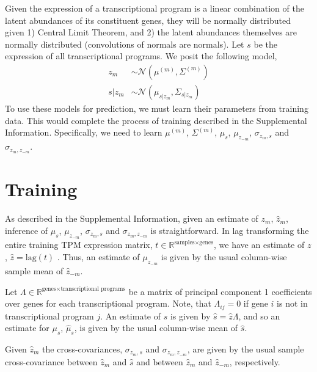 \documentclass[10pt]{article}
\begin{document}
Given the expression of a transcriptional program is a linear combination of the latent abundances of its constituent genes, they will be normally distributed given 1) Central Limit Theorem, and 2) the latent abundances themselves are normally distributed (convolutions of normals are normals). Let $s$ be the expression of all transcriptional programs. We posit the following model, 
\begin{align*}
z_m & \sim \mathcal{N}\left(\mu^{(m)}, \Sigma^{(m)} \right) \\
s|z_m & \sim \mathcal{N}(\mu_{s|z_m}, \Sigma_{s|z_m}) 
\end{align*}
To use these models for prediction, we must learn their parameters from training data. This would complete the process of training described in the Supplemental Information. Specifically, we need to learn $\mu^{(m)}$, $\Sigma^{(m)}$, $\mu_s$, $\mu_{z_{-m}}$, $\sigma_{z_m,s}$ and $\sigma_{z_m,z_{-m}}$.

\section{Training} \label{inference}

As described in the Supplemental Information, given an estimate of $z_m$, $\hat{z}_{m}$, inference of $\mu_s$, $\mu_{z_{-m}}$, $\sigma_{z_m,s}$ and $\sigma_{z_m,z_{-m}}$ is straightforward. In lag transforming the entire training TPM expression matrix, $t \in \mathbb{R}^{\textrm{samples} \times \textrm{genes}}$,  we have an estimate of $z$, $\hat{z} = \textrm{lag}(t)$ \cite{Biswas2016a}. Thus, an estimate of $\mu_{z_{-m}}$ is given by the usual column-wise sample mean of $\hat{z}_{-m}$. 

Let $\Lambda \in \mathbb{R}^{\textrm{genes} \times \textrm{transcriptional programs}}$ be a matrix of principal component 1 coefficients over genes for each transcriptional program. Note, that $\Lambda_{ij} = 0$ if gene $i$ is not in transcriptional program $j$. An estimate of $s$ is given by $\hat{s} = \hat{z}\Lambda$, and so an estimate for $\mu_s$, $\hat{\mu}_s$, is given by the usual column-wise mean of $\hat{s}$. 

Given $\hat{z}_m$ the cross-covariances, $\sigma_{z_m,s}$ and $\sigma_{z_m,z_{-m}}$, are given by the usual sample cross-covariance between $\hat{z}_m$ and $\hat{s}$ and between $\hat{z}_m$ and $\hat{z}_{-m}$, respectively. 
\end{document}
